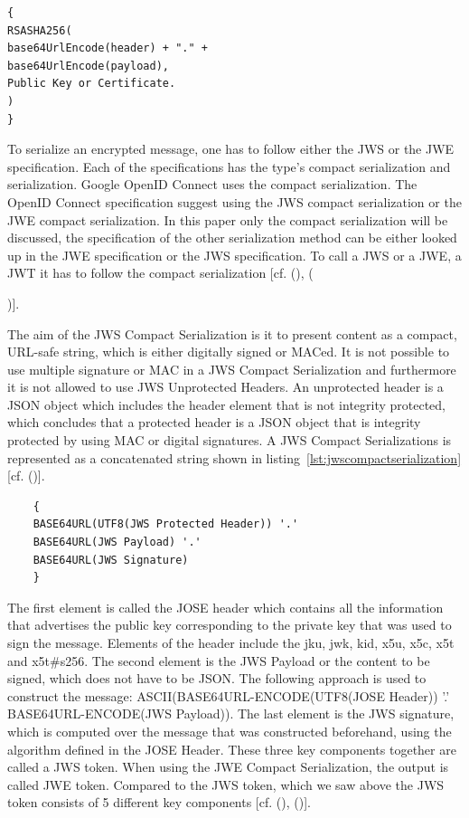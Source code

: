\begin{lstlisting}
{
RSASHA256(
base64UrlEncode(header) + "." +
base64UrlEncode(payload),
Public Key or Certificate.
)
}
\end{lstlisting}


To serialize an encrypted message, one has to follow either the JWS or the JWE specification. Each of the specifications has the type’s compact serialization and serialization. Google OpenID Connect uses the compact serialization. The OpenID Connect specification suggest using the JWS compact serialization or the JWE compact serialization. In this paper only the compact serialization will be discussed, the specification of the other serialization method can be either looked up in the JWE specification or the JWS specification. To call a JWS or a JWE, a JWT it has to follow the compact serialization [cf. (\cite{JWS:IETF:Jones:2015}), ({\cite{JWE:IETF:Jones:2015})].
	
	The aim of the JWS Compact Serialization is it to present content as a compact, URL-safe string, which is either digitally signed or MACed. It is not possible to use multiple signature or MAC in a JWS Compact Serialization and furthermore it is not allowed to use JWS Unprotected Headers. An unprotected header is a JSON object which includes the header element that is not integrity protected, which concludes that a protected header is a JSON object that is integrity protected by using MAC or digital signatures. A JWS Compact Serializations is represented as a concatenated string shown in listing~\ref{lst:jwscompactserialization} [cf. (\cite{JWS:IETF:Jones:2015})].
	
	\begin{lstlisting}
	{
	BASE64URL(UTF8(JWS Protected Header)) '.'
	BASE64URL(JWS Payload) '.'
	BASE64URL(JWS Signature)
	}
	\end{lstlisting}
	
	The first element is called the JOSE header which contains all the information that advertises the public key corresponding to the private key that was used to sign the message. Elements of the header include the jku, jwk, kid, x5u, x5c, x5t and x5t\#s256. The second element is the JWS Payload or the content to be signed, which does not have to be JSON. The following approach is used  to construct the message: ASCII(BASE64URL-ENCODE(UTF8(JOSE Header)) '.' BASE64URL-ENCODE(JWS Payload)). 
	The last element is the JWS signature, which is computed over the message that was constructed beforehand, using the algorithm defined in the JOSE Header. These three key components together are called a JWS token. When using the JWE Compact Serialization, the output is called JWE token. Compared to the JWS token, which we saw above the JWS token consists of 5 different key components [cf. (\cite{JWS:IETF:Jones:2015}), (\cite{JWE:IETF:Jones:2015})].
	
}
